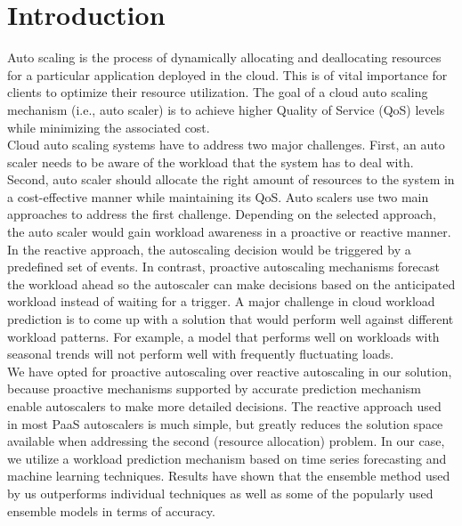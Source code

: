 \section{Introduction}
Auto scaling is the process of dynamically allocating and deallocating resources for a particular application deployed in the cloud. This is of vital importance for clients to optimize their resource utilization. The goal of a cloud auto scaling mechanism (i.e., auto scaler) is to achieve higher Quality of Service (QoS) levels while minimizing the associated cost. \\
Cloud auto scaling systems have to address two major challenges. First, an auto scaler needs to be aware of the workload that the system has to deal with. Second, auto scaler should allocate the right amount of resources to the system in a cost-effective manner while maintaining its QoS. Auto scalers use two main approaches to address the first challenge. Depending on the selected approach, the auto scaler would gain workload awareness in a proactive or reactive manner. In the reactive approach, the autoscaling decision would be triggered by a predefined set of events. In contrast, proactive autoscaling mechanisms forecast the workload ahead so the autoscaler can make decisions based on the anticipated workload instead of waiting for a trigger. A major challenge in cloud workload prediction is to come up with a solution that would perform well against different workload patterns. For example, a model that performs well on workloads with seasonal trends will not perform well with frequently fluctuating loads.\\

We have opted for proactive autoscaling over reactive autoscaling in our solution, because proactive mechanisms supported by accurate prediction mechanism enable autoscalers to make more detailed decisions. The reactive approach used in most PaaS autoscalers is much simple, but greatly reduces the solution space available when addressing the second (resource allocation) problem. In our case, we utilize a workload prediction mechanism based on time series forecasting and machine learning techniques. Results have shown that the ensemble method used by us outperforms individual techniques as well as some of the popularly used ensemble models in terms of accuracy.\\

